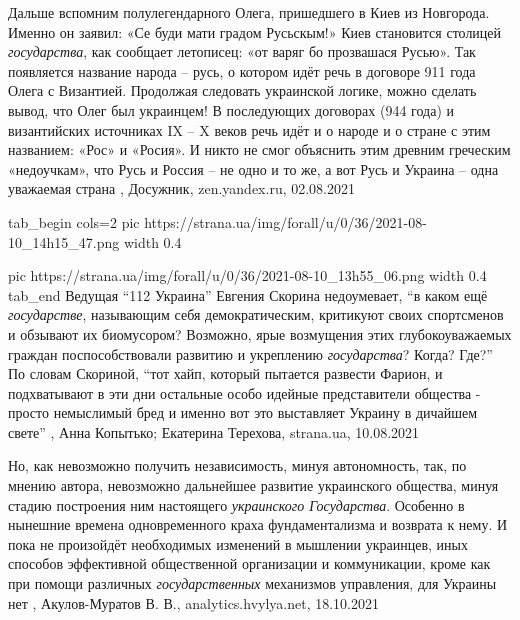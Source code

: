 Дальше вспомним полулегендарного Олега, пришедшего в Киев из Новгорода. Именно
он заявил: «Се буди мати градом Русьскым!» Киев становится столицей
\emph{государства}, как сообщает летописец: «от варяг бо прозвашася Русью». Так
появляется название народа – русь, о котором идёт речь в договоре 911 года
Олега с Византией. Продолжая следовать украинской логике, можно сделать вывод,
что Олег был украинцем!  В последующих договорах (944 года) и византийских
источниках IX – X веков речь идёт и о народе и о стране с этим названием: «Рос»
и «Росия». И никто не смог объяснить этим древним греческим «недоучкам», что
Русь и Россия – не одно и то же, а вот Русь и Украина – одна уважаемая страна
, Досужник, zen.yandex.ru, 02.08.2021

\ifcmt
tab_begin cols=2
  pic https://strana.ua/img/forall/u/0/36/2021-08-10_14h15_47.png
  width 0.4

	pic https://strana.ua/img/forall/u/0/36/2021-08-10_13h55_06.png
  width 0.4
tab_end
\fi
Ведущая \enquote{112 Украина} Евгения Скорина недоумевает, \enquote{в каком ещё \emph{государстве},
называющим себя демократическим, критикуют своих спортсменов и обзывают их
биомусором? Возможно, ярые возмущения этих глубокоуважаемых граждан
поспособствовали развитию и укреплению \emph{государства}? Когда? Где?}
По словам Скориной, \enquote{тот хайп, который пытается развести Фарион, и подхватывают
в эти дни остальные особо идейные представители общества - просто немыслимый
бред и именно вот это выставляет Украину в дичайшем свете} 
, 
Анна Копытько; Екатерина Терехова, strana.ua, 10.08.2021

Но, как невозможно получить независимость, минуя автономность, так, по мнению
автора, невозможно дальнейшее развитие украинского общества, минуя стадию
построения ним настоящего \emph{украинского Государства}. Особенно в нынешние времена
одновременного краха фундаментализма и возврата к нему. И пока не произойдёт
необходимых изменений в мышлении украинцев, иных способов эффективной
общественной организации и коммуникации, кроме как при помощи различных
\emph{государственных} механизмов управления, для Украины нет
, 
Акулов-Муратов В. В., analytics.hvylya.net, 18.10.2021

